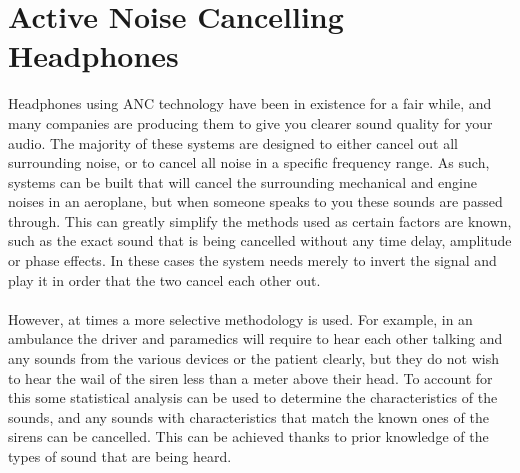 \section{Active Noise Cancelling Headphones}
Headphones using ANC technology have been in existence for a fair while, and many companies are producing them to give you clearer sound quality for your audio.
The majority of these systems are designed to either cancel out all surrounding noise, or to cancel all noise in a specific frequency range.
As such, systems can be built that will cancel the surrounding mechanical and engine noises in an aeroplane, but when someone speaks to you these sounds are passed through.
This can greatly simplify the methods used as certain factors are known, such as the exact sound that is being cancelled without any time delay, amplitude or phase effects.
In these cases the system needs merely to invert the signal and play it in order that the two cancel each other out\cite{EMNoiseCancel}.
\\
\\
However, at times a more selective methodology is used. For example, in an ambulance the driver and paramedics will require to hear each other talking and any sounds from the various devices or the patient clearly, but they do not wish to hear the wail of the siren less than a meter above their head\cite{EMHeadsets}.
To account for this some statistical analysis can be used to determine the characteristics of the sounds, and any sounds with characteristics that match the known ones of the sirens can be cancelled.
This can be achieved thanks to prior knowledge of the types of sound that are being heard.
